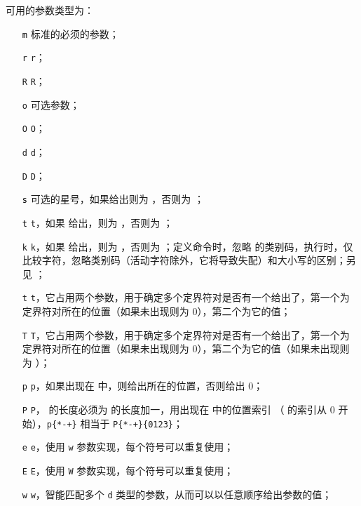 \documentclass{cusdoc}
\begin{document}
{\def\CCD#1{\textcolor{black!60}{\texttt{#1}}}
\def\CCS#1{\textcolor{black}{\texttt{#1}}}
\def\CCE#1{\textcolor{red!90!black}{\texttt{#1}}}
可用的参数类型为：
\begin{itemize}
  \item[\CCS m] 标准的必须的参数；
  \item[\CCD r] \texttt r；
  \item[\CCD R] \texttt R；
  \item[\CCD o] 可选参数；
  \item[\CCD O] \texttt O；
  \item[\CCD d] \texttt d；
  \item[\CCD D] \texttt D；
  \item[\CCS s] 可选的星号，如果给出则为 ，否则为 ；
  \item[\CCS t] \texttt t，如果  给出，则为 ，否则为 ；
  \item[\CCE k] \texttt k，如果  给出，则为 ，否则为 ；定义命令时，忽略  的类别码，执行时，仅比较字符，忽略类别码（活动字符除外，它将导致失配）和大小写的区别；另见 ；
  \item[\CCE t] \texttt t，它占用两个参数，用于确定多个定界符对是否有一个给出了，第一个为定界符对所在的位置（如果未出现则为 $0$），第二个为它的值；
  \item[\CCE T] \texttt T，它占用两个参数，用于确定多个定界符对是否有一个给出了，第一个为定界符对所在的位置（如果未出现则为 $0$），第二个为它的值（如果未出现则为 ）；
  \item[\CCE p] \texttt p，如果出现在  中，则给出所在的位置，否则给出 0；
  \item[\CCE P] \texttt P， 的长度必须为  的长度加一，用出现在  中的位置索引 （ 的索引从 $0$ 开始），\verb|p{*-+}| 相当于 \verb|P{*-+}{0123}|；
  \item[\CCE e] \texttt e，使用 \texttt w 参数实现，每个符号可以重复使用；
  \item[\CCE E] \texttt E，使用 \texttt W 参数实现，每个符号可以重复使用；
  \item[\CCE w] \texttt w，智能匹配多个 \texttt d 类型的参数，从而可以以任意顺序给出参数的值；

\end{itemize}}
\end{document}
